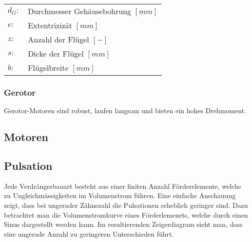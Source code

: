 \begin{tabular}{ll}
$d_G:$ & Durchmesser Gehäusebohrung $[mm]$\\
$e:$ & Extentrizizät $[mm]$\\
$z:$ & Anzahl der Flügel $[-]$\\
$s:$ & Dicke der Flügel $[mm]$\\
$b:$ & Flügelbreite $[mm]$
\end{tabular}


\subsubsection{Gerotor}
Gerotor-Motoren sind robust, laufen langsam und bieten ein hohes Drehmoment. 

\subsection{Motoren}

\subsection{Pulsation}
Jede Verdrängerbauart besteht aus einer finiten Anzahl Förderelemente, welche zu Ungleichmässigkeiten im Volumenstrom führen. Eine einfache Anschauung zeigt, dass bei ungerader Zähnezahl die Pulsationen erheblich geringer sind. Dazu betrachtet man die Volumenstromkurve eines Förderlemenets, welche durch einen Sinus dargestellt werden kann. Im resultierenden Zeigerdiagram sieht man, dass eine ungerade Anzahl zu geringeren Unterschieden führt. 


\vfill
